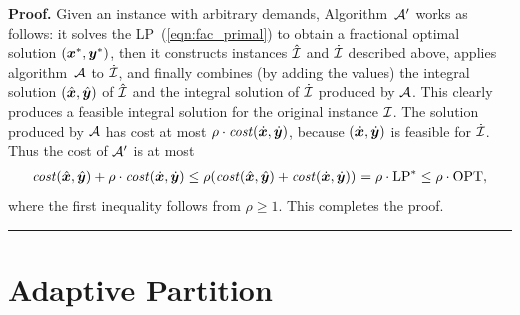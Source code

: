\documentclass[oneside,final]{ucr}
\newenvironment{proof}[1][Proof]{\textbf{#1.} }{\ \rule{0.5em}{0.5em}}
\begin{document}

\begin{proof}
  Given an {\FTFP} instance with arbitrary demands, Algorithm~$\calA'$ works
as follows: it solves the LP~(\ref{eqn:fac_primal}) to obtain a
  fractional optimal solution $(\boldsymbol{x}^\ast,\boldsymbol{y}^\ast)$, then it constructs
  instances $\hatcalI$ and $\dotcalI$ described above,  applies
  algorithm~$\calA$ to $\dotcalI$, and finally combines (by adding
  the values) the integral solution $(\hat{\boldsymbol{x}}, \hat{\boldsymbol{y}})$ of
  $\hatcalI$ and the integral solution of $\dotcalI$ produced
  by $\calA$. This clearly produces a feasible integral
  solution for the original instance $\mathcal{I}$.
The solution produced by $\calA$ has cost at most
$\rho\cdot{\it cost}(\dot{\boldsymbol{x}},\dot{\boldsymbol{y}})$, because $(\dot{\boldsymbol{x}},\dot{\boldsymbol{y}})$
is feasible for $\dotcalI$. Thus the cost of $\calA'$ is at most
% 
 \begin{align*}
 {\it cost}(\hat{\boldsymbol{x}}, \hat{\boldsymbol{y}}) + \rho\cdot{\it cost}(\dot{\boldsymbol{x}},\dot{\boldsymbol{y}})
	\le
 \rho({\it cost}(\hat{\boldsymbol{x}}, \hat{\boldsymbol{y}}) + {\it cost}(\dot{\boldsymbol{x}},\dot{\boldsymbol{y}}))
		= \rho\cdot\mbox{\rm LP}^\ast \le \rho\cdot\mbox{\rm OPT},
  \end{align*}
%
where the first inequality follows from $\rho\geq 1$. This completes
the proof.
\end{proof}

\section{Adaptive Partition}
\label{sec: adaptive partitioning}
\end{document}
